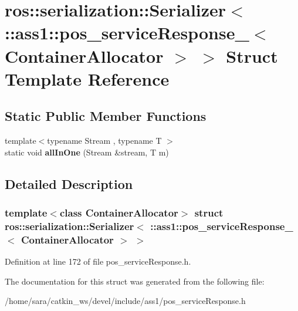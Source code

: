 \hypertarget{structros_1_1serialization_1_1Serializer_3_01_1_1ass1_1_1pos__serviceResponse___3_01ContainerAllocator_01_4_01_4}{}\section{ros\+:\+:serialization\+:\+:Serializer$<$ \+:\+:ass1\+:\+:pos\+\_\+service\+Response\+\_\+$<$ Container\+Allocator $>$ $>$ Struct Template Reference}
\label{structros_1_1serialization_1_1Serializer_3_01_1_1ass1_1_1pos__serviceResponse___3_01ContainerAllocator_01_4_01_4}
\subsection*{Static Public Member Functions}
\begin{DoxyCompactItemize}
\item 
\mbox{\label{structros_1_1serialization_1_1Serializer_3_01_1_1ass1_1_1pos__serviceResponse___3_01ContainerAllocator_01_4_01_4_a394718281f2ab8b4691275516d8b8e36}} 
{\footnotesize template$<$typename Stream , typename T $>$ }\\static void {\bfseries all\+In\+One} (Stream \&stream, T m)
\end{DoxyCompactItemize}


\subsection{Detailed Description}
\subsubsection*{template$<$class Container\+Allocator$>$\newline
struct ros\+::serialization\+::\+Serializer$<$ \+::ass1\+::pos\+\_\+service\+Response\+\_\+$<$ Container\+Allocator $>$ $>$}



Definition at line 172 of file pos\+\_\+service\+Response.\+h.



The documentation for this struct was generated from the following file\+:\begin{DoxyCompactItemize}
\item 
/home/sara/catkin\+\_\+ws/devel/include/ass1/pos\+\_\+service\+Response.\+h\end{DoxyCompactItemize}
